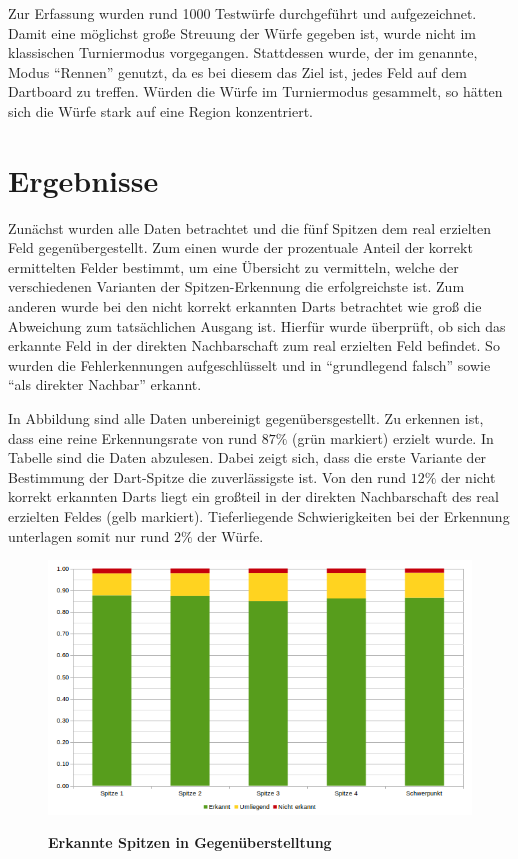 Zur Erfassung wurden rund 1000  Testwürfe durchgeführt und aufgezeichnet. Damit eine möglichst große Streuung der Würfe gegeben ist, wurde nicht im klassischen Turniermodus vorgegangen. Stattdessen wurde, der im  genannte, Modus "`Rennen"' genutzt, da es bei diesem das Ziel ist, jedes Feld auf dem Dartboard zu treffen. Würden die Würfe im Turniermodus gesammelt, so hätten sich die Würfe stark auf eine Region konzentriert.


\section*{Ergebnisse}
\label{sec:results}
Zunächst wurden alle Daten betrachtet und die fünf Spitzen dem real erzielten Feld gegenübergestellt. Zum einen wurde der prozentuale Anteil der korrekt ermittelten Felder bestimmt, um eine Übersicht zu vermitteln, welche der verschiedenen Varianten der Spitzen-Erkennung die erfolgreichste ist. Zum anderen wurde bei den nicht korrekt erkannten Darts betrachtet wie groß die Abweichung zum tatsächlichen Ausgang ist. Hierfür wurde überprüft, ob sich das erkannte Feld in der direkten Nachbarschaft zum real erzielten Feld befindet. So wurden die Fehlerkennungen aufgeschlüsselt und in "`grundlegend falsch"' sowie "`als direkter Nachbar"' erkannt.


In Abbildung   sind alle Daten unbereinigt gegenübersgestellt. Zu erkennen ist, dass eine reine Erkennungsrate von rund $87\%$ (grün markiert) erzielt wurde. In Tabelle  sind die Daten abzulesen. Dabei zeigt sich, dass die erste Variante der Bestimmung der Dart-Spitze die zuverlässigste ist. Von den rund $12\%$ der nicht korrekt erkannten Darts liegt ein großteil in der direkten Nachbarschaft des real erzielten Feldes (gelb markiert). Tieferliegende Schwierigkeiten bei der Erkennung unterlagen somit nur rund $2\%$ der Würfe.
\begin{figure}[ht]
\centering
\includegraphics[width=\textwidth]{media/chartplain}\\
\caption{\textbf{Erkannte Spitzen in Gegenüberstelltung}}
\label{Fig:plainchart}
\end{figure}

